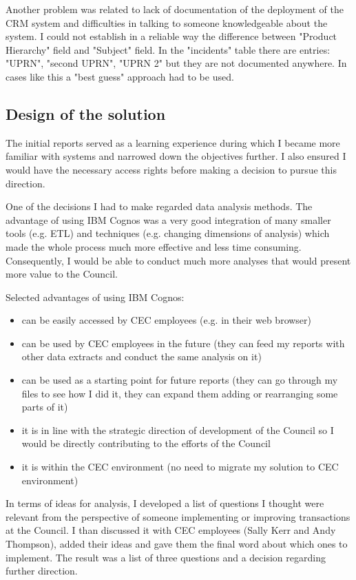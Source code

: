 Another problem was related to lack of documentation of the deployment of the CRM system and difficulties in talking to someone knowledgeable about the system. I could not establish in a reliable way the difference between "Product Hierarchy" field and "Subject" field. In the "incidents" table there are entries: "UPRN", "second UPRN", "UPRN 2" but they are not documented anywhere. In cases like this a "best guess" approach had to be used. 
				
		\subsection{Design of the solution}
		
The initial reports served as a learning experience during which I became more familiar with systems and narrowed down the objectives further. I also ensured I would have the necessary access rights before making a decision to pursue this direction.

One of the decisions I had to make regarded data analysis methods. The advantage of using IBM Cognos was a very good integration of many smaller tools (e.g. ETL) and techniques (e.g. changing dimensions of analysis) which made the whole process much more effective and less time consuming. Consequently, I would be able to conduct much more analyses that would present more value to the Council.

Selected advantages of using IBM Cognos:
\begin{itemize}
\item can be easily accessed by CEC employees (e.g. in their web browser)
\item can be used by CEC employees in the future (they can feed my reports with other data extracts and conduct the same analysis on it)
\item can be used as a starting point for future reports (they can go through my files to see how I did it, they can expand them adding or rearranging some parts of it)
\item it is in line with the strategic direction of development of the Council so I would be directly contributing to the efforts of the Council
\item it is within the CEC environment (no need to migrate my solution to CEC environment)
\end{itemize}

In terms of ideas for analysis, I developed a list of questions I thought were relevant from the perspective of someone implementing or improving transactions at the Council. I than discussed it with CEC employees (Sally Kerr and Andy Thompson), added their ideas and gave them the final word about which ones to implement. The result was a list of three questions and a decision regarding further direction.
		

